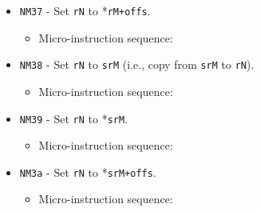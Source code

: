 \documentclass{article}
\def\specialtodata#1{\Verb|#1002| - output \Verb|sr#1| to data bus}
\def\specialptodata#1{\Verb|#1202| - output *\Verb|sr#1| to data bus}
\def\specialptodatao#1{\Verb|#1302| - output *(\Verb|sr#1|+\Verb|offs|) to data bus}
\def\pkptrout{\Verb|0202| - output *\Verb|pk| to data bus}
\def\datatooffs{\Verb|4402| - write to \Verb|offs| from data bus}
\def\incrementpk{\Verb|0502| - increment \Verb|pk|}
\def\regptodatao#1{\Verb|#1303| - output *(\Verb|r#1|+\Verb|offs|) to data bus}
\def\datatoreg#1{\Verb|#1403| - write to \Verb|r#1| from data bus}
\def\done{\Verb|fffe| - end instruction}
\begin{document}
\begin{itemize}
    \item \Verb|NM37| - Set \Verb|rN| to *\Verb|rM+offs|.
    \begin{itemize}
        \item Micro-instruction sequence:
    \end{itemize}
    
    \item \Verb|NM38| - Set \Verb|rN| to \Verb|srM| (i.e., copy from \Verb|srM| to \Verb|rN|).
    \begin{itemize}
        \item Micro-instruction sequence:
    \end{itemize}

    \item \Verb|NM39| - Set \Verb|rN| to *\Verb|srM|.
    \begin{itemize}
        \item Micro-instruction sequence:
    \end{itemize}
    
    \item \Verb|NM3a| - Set \Verb|rN| to *\Verb|srM+offs|.
    \begin{itemize}
        \item Micro-instruction sequence:
    \end{itemize}


\end{itemize}
\end{document}
